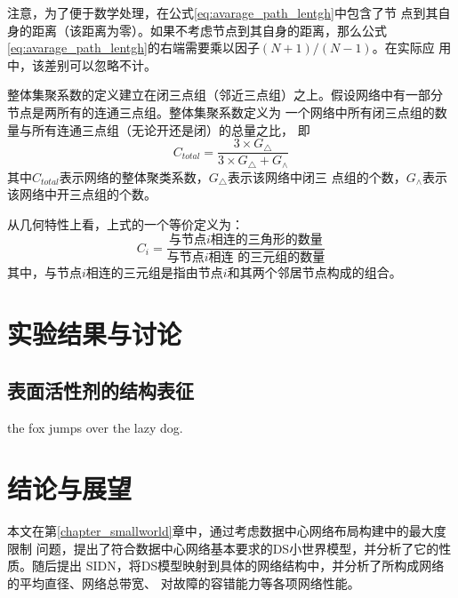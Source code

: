 \documentclass[bachelor,adobefonts]{jnuthesis} %
\begin{document}
    注意，为了便于数学处理，在公式\eqref{eq:avarage_path_lentgh}中包含了节
    点到其自身的距离（该距离为零）。如果不考虑节点到其自身的距离，那么公式
    \eqref{eq:avarage_path_lentgh}的右端需要乘以因子$(N+1)/(N-1)$。在实际应
    用中，该差别可以忽略不计。
    
    \begin{definition}[整体聚类系数]
        整体集聚系数的定义建立在闭三点组（邻近三点组）之上。假设网络中有一部分
        节点是两所有的连通三点组。整体集聚系数定义为
        一个网络中所有闭三点组的数量与所有连通三点组（无论开还是闭）的总量之比，
        即
        \[
        C_{total}=\frac{3\times G_{\triangle}}{3 \times G_{\triangle} + G_{\wedge}}
        \]
        其中$C_{total}$表示网络的整体聚类系数，$G_{\triangle}$表示该网络中闭三
        点组的个数，$G_{\wedge}$表示该网络中开三点组的个数\cite{luce1949method}。
    \end{definition}
    
    \begin{definition}[局部聚类系数]
        从几何特性上看，上式的一个等价定义为：
        \begin{equation}\label{eq:clustering_coefficient_triangle}
        C_i = \frac{\text{与节点$i$相连的三角形的数量}}{\text{与节点$i$相连
                的三元组的数量}}
        \end{equation}
        其中，与节点$i$相连的三元组是指由节点$i$和其两个邻居节点构成的组合。
    \end{definition}
    
    \chapter{实验结果与讨论}\label{chapter:results}
    \section{表面活性剂的结构表征}
    the fox jumps over the lazy dog.
        
    \chapter{结论与展望}\label{chapter:concludes}
    
    本文在第\ref{chapter_smallworld}章中，通过\cite{newman2001structure}考虑数据中心网络布局构建中的最大度限制
    问题，提出了符合数据中心网络基本要求的DS小世界模型，并分析了它的性质。随后提出
    SIDN，将DS模型映射到具体的网络结构中，并分析了所构成网络的平均直径、网络总带宽、
    对故障的容错能力等各项网络性能。
    
\end{document}

